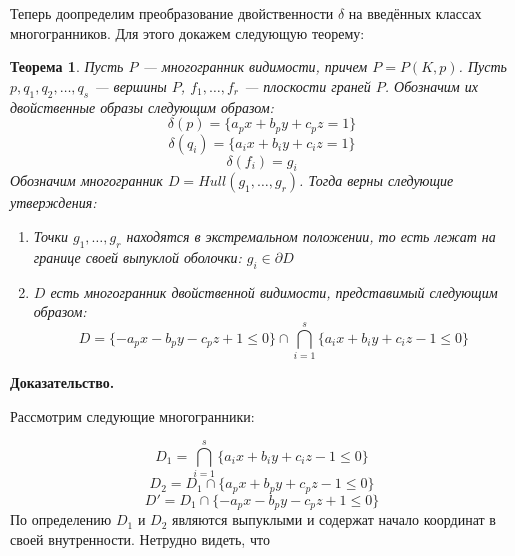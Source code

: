 \documentclass[a4paper, 10pt]{article}
\theoremstyle{definition}
\theoremstyle{plain}
\newtheorem{SmartTheorem}{Теорема}
\theoremstyle{plain}
\begin{document}
Теперь доопределим преобразование двойственности $\delta$ на введённых классах
многогранников. Для этого докажем следующую теорему:

\begin{SmartTheorem}
\label{theorem:duality-expansion}
 Пусть $P$ --- многогранник видимости, причем $P = P(K, p)$. Пусть
 $p, q_{1}, q_{2}, \ldots, q_{s}$ --- вершины $P$, $f_{1}, \ldots, f_{r}$ ---
 плоскости граней $P$. Обозначим их двойственные образы следующим образом:
 \begin{equation*}
  \delta(p) = \{a_{p} x + b_{p} y + c_{p} z = 1\}
 \end{equation*}
 \begin{equation*}
  \delta(q_{i}) = \{a_{i} x + b_{i} y + c_{i} z = 1\}
 \end{equation*}
 \begin{equation*}
  \delta(f_{i}) = g_{i}
 \end{equation*}
 Обозначим многогранник $D = Hull(g_{1}, \ldots, g_{r})$. Тогда верны следующие
 утверждения:
 \begin{enumerate}
  \item Точки $g_{1}, \ldots, g_{r}$ находятся в экстремальном положении, то
  есть лежат на границе своей выпуклой оболочки: $g_{i} \in \partial D$
  \item $D$ есть многогранник двойственной видимости, представимый следующим
  образом:
  \begin{equation}
  \label{equation:dual-visibility-polyhedron}
   D = \{-a_{p} x - b_{p} y - c_{p} z + 1 \leq 0\} \cap
   \bigcap \limits_{i = 1}^{s} \{a_{i} x + b_{i} y + c_{i} z - 1 \leq 0\}
  \end{equation}
 \end{enumerate}
\end{SmartTheorem}

\textbf{Доказательство.}

Рассмотрим следующие многогранники:

\begin{equation*}
 D_{1} = \bigcap \limits_{i = 1}^{s} \{a_{i} x + b_{i} y + c_{i} z - 1 \leq 0\}
\end{equation*}
\begin{equation*}
 D_{2} = D_{1} \cap \{a_{p} x + b_{p} y + c_{p} z - 1 \leq 0\}
\end{equation*}
\begin{equation*}
 D' = D_{1} \cap \{-a_{p} x - b_{p} y - c_{p} z + 1 \leq 0\}
\end{equation*}
По определению $D_{1}$ и $D_{2}$ являются выпуклыми и содержат начало координат
в своей внутренности. Нетрудно видеть, что
\end{document}
